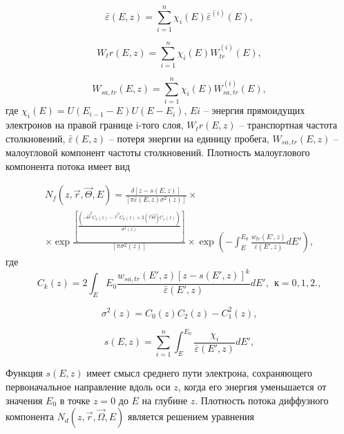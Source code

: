 \begin{equation}
\bar{\varepsilon}(E,z)=\sum_{i=1}^n \chi_i (E)\bar{\varepsilon}^{(i)} (E),
\label{eq:2}
\end{equation}

\begin{equation}
W_tr(E,z)=\sum_{i=1}^n \chi_i (E)W_{tr}^{(i)} (E),
\label{eq:3}
\end{equation}

\begin{equation}
W_{sa,tr}(E,z)=\sum_{i=1}^n \chi_i (E)W_{sa,tr}^{(i)} (E),
\label{eq:4}
\end{equation}
где
$ \chi_i(E)=U(E_{i-1}-E)U(E-E_i) $,
$Ei$ – энергия прямоидущих электронов на правой границе i-того слоя, $W_tr(E,z)$ –
транспортная частота столкновений, $\bar{\varepsilon}(E,z)$ – потеря энергии на единицу пробега, $W_{sa,tr}(E,z)$ – малоугловой компонент частоты столкновений.
Плотность малоуглового компонента потока имеет вид \cite{smolar}

\begin{gather}
N_f(z,\vec{r},\vec{\Theta},E)=\frac{\delta[z-s(E,z)]}{[\pi \bar{\varepsilon}(E,z)\sigma^2(z)]}\times\nonumber\\
\times \exp \frac{[\frac{(-\vec{\Theta}^2 C_2(z)-\vec{r}^2C_0 (z)+2(\vec{r}\vec{\Theta})C_1(z))}{\sigma^2(z)}]}{[\pi\sigma^2(z)]} \times \exp\left(-\int_{E}^{E_0} \frac{w_{tr}(E',z)}{\bar{\varepsilon}(E',z)}dE'\right),
\label{eq:6}
\end{gather}
где
\begin{equation}
C_k(z)=2 \int_{E}{E_0} \frac{w_{sa,tr}(E',z)[z-s(E',z)]^k}{\bar{\varepsilon}(E',z)} dE',\>\> к=0,1,2.,
\label{eq:7}
\end{equation}

\begin{equation}
\sigma^2(z)=C_0(z)C_2(z)-C_1^2(z),
\label{eq:8}
\end{equation}

\begin{equation}
s(E,z)=\sum_{i=1}^{n} \int_{E}^{E_0} \frac{\chi_i}{\bar{\varepsilon}(E',z)} dE',
\label{eq:9}
\end{equation}

Функция $s(E, z)$ имеет смысл среднего пути электрона, сохраняющего первоначальное
направление вдоль оси $z$, когда его энергия уменьшается от значения $E_0$ в точке $z=0$ до $E$
на глубине $z$.
Плотность потока диффузного компонента $N_d(z,\vec{r},\vec{\Omega},E)$ является решением
уравнения \cite{smolar}

